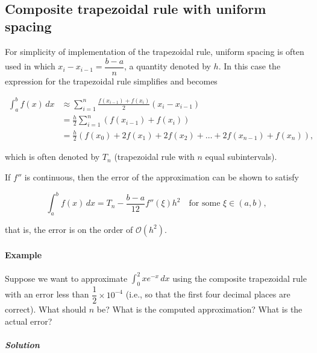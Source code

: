 \documentclass[11pt]{article}
\begin{document}
    \begin{center}
    \end{center}
    { \hspace*{\fill} \\}
    
    \subsection{Composite trapezoidal rule with uniform
spacing}\label{composite-trapezoidal-rule-with-uniform-spacing}

For simplicity of implementation of the trapezoidal rule, uniform
spacing is often used in which \(x_i-x_{i-1}=\dfrac{b-a}{n}\), a
quantity denoted by \(h\). In this case the expression for the
trapezoidal rule simplifies and becomes

\begin{align*}
  \int_a^b f(x)\,dx
  &\approx
  \sum_{i=1}^n\frac{f(x_{i-1})+f(x_i)}{2}(x_i-x_{i-1})\\
  &=
  \frac{h}{2}\sum_{i=1}^n\left(f(x_{i-1})+f(x_i)\right)\\
  &=
  \frac{h}{2}\left(f(x_0)+2f(x_1)+2f(x_2)+\dots+2f(x_{n-1})+f(x_n)\right),
\end{align*}

which is often denoted by \(T_n\) (trapezoidal rule with \(n\) equal
subintervals).

If \(f''\) is continuous, then the error of the approximation can be
shown to satisfy

\begin{equation*}
  \int_a^b f(x)\,dx
  =
  T_n
  -
  \frac{b-a}{12}f''(\xi)h^2
  \quad
  \text{for some }
  \xi\in(a,b),
\end{equation*}

that is, the error is on the order of \(\mathcal{O}(h^2)\).

    \paragraph{Example}\label{example}

Suppose we want to approximate \(\displaystyle\int_0^2 xe^{-x}\,dx\)
using the composite trapezoidal rule with an error less than
\(\dfrac{1}{2}\times10^{-4}\) (i.e., so that the first four decimal
places are correct). What should \(n\) be? What is the computed
approximation? What is the actual error?

\subparagraph{Solution}\label{solution}
\end{document}
